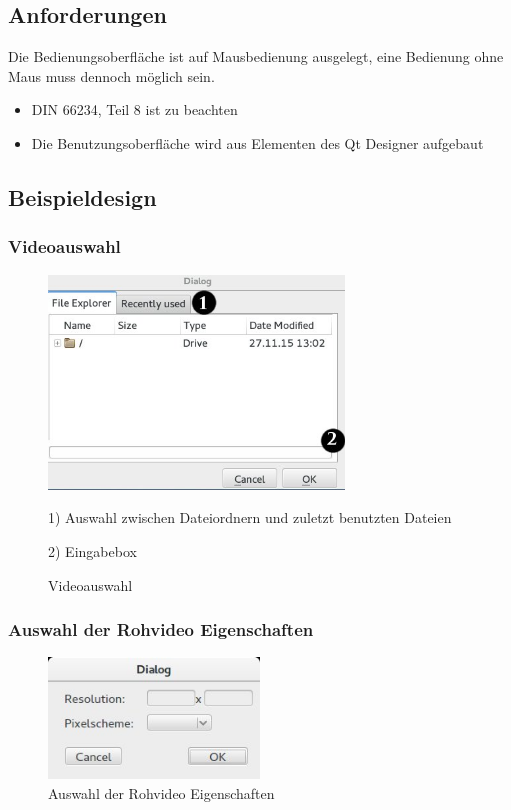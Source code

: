 \documentclass[parskip=full]{scrartcl}
\begin{document}
\subsection{Anforderungen}
Die Bedienungsoberfläche ist auf Mausbedienung ausgelegt, eine Bedienung ohne Maus muss dennoch möglich sein.
\begin{itemize}
\item DIN 66234, Teil 8 ist zu beachten
\item Die Benutzungsoberfläche wird aus Elementen des Qt Designer aufgebaut
\end{itemize}
\subsection{Beispieldesign}

\subsubsection{Videoauswahl}
\begin{figure}[htbp] 
\centering
\includegraphics[width=0.7\textwidth]{ToViET/Screenshots/Fileselector.jpg}
\caption{Videoauswahl}
\begin{flushleft}
\item 1) Auswahl zwischen Dateiordnern und zuletzt benutzten Dateien
\item 2) Eingabebox 

\end{flushleft}
\end{figure}
\subsubsection{Auswahl der Rohvideo Eigenschaften}
\begin{figure}[htbp] 
\centering
\includegraphics[width=0.5\textwidth]{ToViET/Screenshots/RawVidProperties.jpg}
\caption{Auswahl der Rohvideo Eigenschaften}

\end{figure}
\newpage
\end{document}

